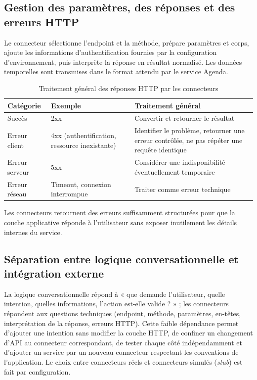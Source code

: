 \documentclass[11pt,a4paper,openany,oneside]{report}
\begin{document}
\subsection{Gestion des paramètres, des réponses et des erreurs HTTP}
Le connecteur sélectionne l'endpoint et la méthode, prépare paramètres et corps, ajoute les informations d'authentification fournies par la configuration d'environnement, puis interprète la réponse en résultat normalisé. Les données temporelles sont transmises dans le format attendu par le service Agenda.

\begin{table}[htbp]
\centering\small
\caption{Traitement général des réponses HTTP par les connecteurs}\label{tab:http}
\begin{tabularx}{\textwidth}{@{}p{3.4cm}p{3.4cm}X@{}}
\toprule
\textbf{Catégorie} & \textbf{Exemple} & \textbf{Traitement général} \\
\midrule
Succès & 2xx & Convertir et retourner le résultat \\
Erreur client & 4xx (authentification, ressource inexistante) & Identifier le problème, retourner une erreur contrôlée, ne pas répéter une requête identique \\
Erreur serveur & 5xx & Considérer une indisponibilité éventuellement temporaire \\
Erreur réseau & Timeout, connexion interrompue & Traiter comme erreur technique \\
\bottomrule
\end{tabularx}
\end{table}

Les connecteurs retournent des erreurs suffisamment structurées pour que la couche applicative réponde à l'utilisateur sans exposer inutilement les détails internes du service.

\subsection{Séparation entre logique conversationnelle et intégration externe}
La logique conversationnelle répond à « que demande l'utilisateur, quelle intention, quelles informations, l'action est-elle valide ? » ; les connecteurs répondent aux questions techniques (endpoint, méthode, paramètres, en-têtes, interprétation de la réponse, erreurs HTTP). Cette faible dépendance permet d'ajouter une intention sans modifier la couche HTTP, de confiner un changement d'API au connecteur correspondant, de tester chaque côté indépendamment et d'ajouter un service par un nouveau connecteur respectant les conventions de l'application. Le choix entre connecteurs réels et connecteurs simulés (\emph{stub}) est fait par configuration.
\end{document}
